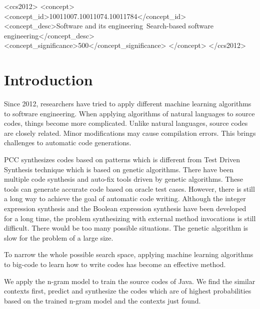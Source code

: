 \documentclass{sig-alternate-05-2015}
\begin{document}
\vspace{-0.1cm}
\begin{CCSXML}
<ccs2012>
<concept>
<concept_id>10011007.10011074.10011784</concept_id>
<concept_desc>Software and its engineering~Search-based software engineering</concept_desc>
<concept_significance>500</concept_significance>
</concept>
</ccs2012>
\end{CCSXML}
\printccsdesc

\vspace{-0.1cm}
\vspace{-0.1cm}

\section{Introduction}

Since 2012, researchers have tried to apply different machine learning algorithms to software engineering. When applying algorithms of natural languages to source codes, things become more complicated. Unlike natural languages, source codes are closely related. Minor modifications may cause compilation errors. This brings challenges to automatic code generations.

PCC synthesizes codes based on patterns which is different from Test Driven Synthesis technique which is based on genetic algorithms. There have been multiple code synthesis and auto-fix tools \cite{DBLP:conf/icse/WeimerNGF09}\cite{nguyen2013semfix}\cite{perelman2014test} driven by genetic algorithms. These tools can generate accurate code based on oracle test cases. However, there is still a long way to achieve the goal of automatic code writing. Although the integer expression synthesis and the Boolean expression synthesis have been developed for a long time, the problem synthesizing with external method invocations is still difficult. There would be too many possible situations. The genetic algorithm is slow for the problem of a large size.

To narrow the whole possible search space, applying machine learning algorithms to big-code to learn how to write codes has become an effective method.

We apply the n-gram model to train the source codes of Java. We find the similar contexts first, predict and synthesize the codes which are of highest probabilities based on the trained n-gram model and the contexts just found.
\end{document}
